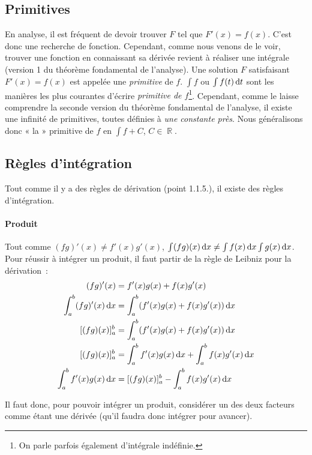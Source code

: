 \documentclass{article}
\DeclareMathOperator{\R}{\mathbb R}
\theoremstyle{definition}
\theoremstyle{remark}
\begin{document}
	\subsection{Primitives}
			En analyse, il est fréquent de devoir trouver $F$ tel que $F'(x) = f(x)$. C'est donc une recherche de fonction. Cependant, comme
			nous venons de le voir, trouver une fonction en connaissant sa dérivée revient à réaliser une intégrale (version 1 du théorème fondamental
			de l'analyse). Une solution $F$ satisfaisant $F'(x) = f(x)$ est appelée une \textit{primitive} de $f$. $\int f$ ou $\int f(t)\dif t$ sont
			les manières les plus courantes d'écrire \textit{primitive de $f$}\footnote{On parle parfois également d'intégrale indéfinie.}.
			Cependant, comme le laisse comprendre la seconde version du théorème fondamental de l'analyse, il existe une infinité de primitives,
			toutes définies à \textit{une constante près}. Nous généralisons donc «  la » primitive de $f$ en $\int f + C$, $C \in \R$.

	\subsection{Règles d'intégration}
			Tout comme il y a des règles de dérivation (point 1.1.5.), il existe des règles d'intégration.

			\paragraph{Produit}
				Tout comme $(fg)'(x) \neq f'(x)g'(x)$, $\int (fg)(x)\dif x \neq \int f(x)\dif x \int g(x) \dif x$. Pour réussir à intégrer un
				produit, il faut partir de la règle de Leibniz pour la dérivation~:
				\[
					\begin{aligned}
						(fg)'(x) &= f'(x)g(x) + f(x)g'(x) \\
						\int_a^b (fg)'(x) \dif x &= \int_a^b (f'(x)g(x) + f(x)g'(x)) \dif x \\
						[(fg)(x)]_a^b &= \int_a^b (f'(x)g(x) + f(x)g'(x)) \dif x \\
						[(fg)(x)]_a^b &= \int_a^b f'(x)g(x) \dif x + \int_a^b f(x)g'(x) \dif x \\
						\int_a^b f'(x)g(x) \dif x &= [(fg)(x)]_a^b - \int_a^b f(x)g'(x) \dif x
					\end{aligned}
				\]

				Il faut donc, pour pouvoir intégrer un produit, considérer un des deux facteurs comme étant une dérivée (qu'il faudra donc
				intégrer pour avancer).
\end{document}
